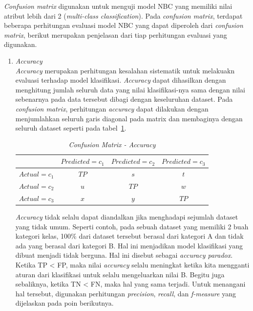 \textit{Confusion matrix} digunakan untuk menguji model NBC yang memiliki nilai atribut lebih dari 2 (\textit{multi-class classification}). Pada \textit{confusion matrix}, terdapat beberapa perhitungan evaluasi model NBC yang dapat diperoleh dari \textit{confusion matrix}, berikut merupakan penjelasan dari tiap perhitungan evaluasi yang digunakan.
\begin{enumerate}
	\item \textit{Accuracy}\\
	\textit{Accuracy} merupakan perhitungan kesalahan sistematik untuk melakuakn evaluasi terhadap model klasifikasi. \textit{Accuracy} dapat dihasilkan dengan menghitung jumlah seluruh data yang nilai klasifikasi-nya sama dengan nilai sebenarnya pada data tersebut dibagi dengan keseluruhan dataset. Pada \textit{confusion matrix}, perhitungan \textit{accuracy} dapat dilakukan dengan menjumlahkan seluruh garis diagonal pada matrix dan membaginya dengan seluruh dataset seperti pada tabel~\ref{tab:confusion_accuracy}.
	
\begin{table}[H]
\centering
\caption{\textit{Confusion Matrix - Accuracy}}
\label{tab:confusion_accuracy}
\begin{tabular}{ | c | c | c | c | }
\hline
 & $Predicted=c_1$ & $Predicted=c_2$ & $Predicted=c_3$ \\ \hline \hline
$Actual=c_1$ & $TP$ & $s$ & $t$ \\ \hline
$Actual=c_2$ & $u$ & $TP$ & $w$ \\ \hline
$Actual=c_3$ & $x$ & $y$ & $TP$ \\ \hline
\end{tabular}
\end{table}

	 \textit{Accuracy} tidak selalu dapat diandalkan jika menghadapi sejumlah dataset yang tidak umum. Seperti contoh, pada sebuah dataset yang memiliki 2 buah kategori kelas, 100\% dari dataset tersebut berasal dari kategori A dan tidak ada yang berasal dari kategori B. Hal ini menjadikan model klasifikasi yang dibuat menjadi tidak berguna. Hal ini disebut sebagai \textit{accuracy paradox}. Ketika TP < FP, maka nilai \textit{accuracy} selalu meningkat ketika kita mengganti aturan dari klasifikasi untuk selalu mengeluarkan nilai B. Begitu juga sebaliknya, ketika TN < FN, maka hal yang sama terjadi. Untuk menangani hal tersebut, digunakan perhitungan \textit{precision}, \textit{recall}, dan \textit{f-measure} yang dijelaskan pada poin berikutnya.
	 

\end{enumerate}
